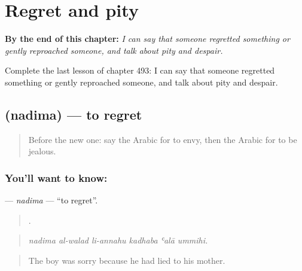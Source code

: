 
\chapter{Regret and pity}
\label{ch:ar-regret-and-pity}

\begin{chapteropening}
\textbf{By the end of this chapter:} \emph{I can say that someone regretted something or gently reproached someone, and talk about pity and despair.}

Complete the last lesson of chapter 493: I can say that someone regretted something or gently reproached someone, and talk about pity and despair.
\end{chapteropening}

\section[\texorpdfstring{\ar{ندم} (nadima)}{ندم (nadima)}]{ (nadima) — to regret}

\label{lesson:AR-C493-nadima}



\begin{quote}
Before the new one: say the Arabic for to envy, then the Arabic for to be jealous.
\end{quote}

\subsection*{You'll want to know: }
\textbf{} — \emph{nadima} — \textquotedblleft{}to regret\textquotedblright{}.

\begin{quote}
     .
\end{quote}

\begin{quote}
\emph{nadima al-walad li-annahu kadhaba ʿalā ummihi.}
\end{quote}

\begin{quote}
The boy was sorry because he had lied to his mother.
\end{quote}

